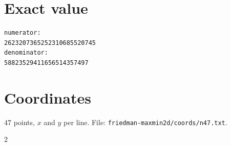 \documentclass[11pt,a4paper]{article}
\begin{document}
\appendix
\section{Exact value}
{\small
\begin{verbatim}
numerator:
2623207365252310685520745
denominator:
58823529411656514357497
\end{verbatim}}

\section{Coordinates}
47 points, $x$ and $y$ per line. File: \texttt{friedman-maxmin2d/coords/n47.txt}.
{\tiny
\begin{multicols}{2}
\end{multicols}}
\end{document}
